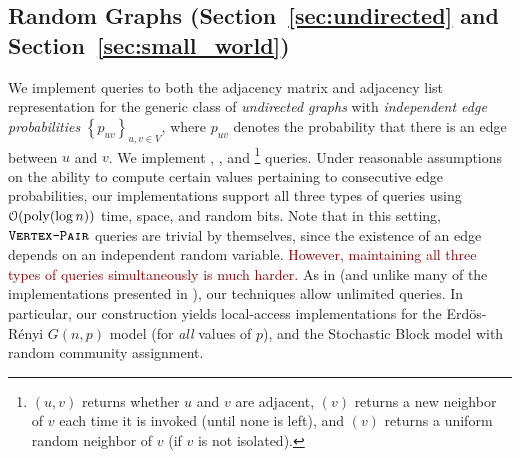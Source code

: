 \subsection{Random Graphs (Section~\ref{sec:undirected} and Section~\ref{sec:small_world})}%
\label{sec:random_graphs}
We implement queries to both the adjacency matrix and adjacency list representation
for the generic class of \emph{undirected graphs} with {\em independent edge probabilities} $\left\{ p_{uv} \right\}_{u,v\in V}$,
where $p_{uv}$ denotes the probability that there is an edge between $u$ and $v$.
We implement , , and 
\footnote{$(u,v)$ returns whether $u$ and $v$ are adjacent, $(v)$ returns a new neighbor of $v$ each time
it is invoked (until none is left), and $(v)$ returns a uniform random neighbor of $v$ (if $v$ is not isolated).} queries.
Under reasonable assumptions on the ability to compute certain values pertaining to consecutive edge probabilities,
our implementations support all three types of queries using $\mathcal{O}(\mathrm{poly}(\log n))$ time, space, and random bits.
Note that in this setting, $\texttt{\textsc{Vertex-Pair}}$ queries are trivial by themselves,
since the existence of an edge depends on an independent random variable.
\textcolor{Maroon}{However, maintaining all three types of queries simultaneously is much harder.}
As in \cite{reut} (and unlike many of the implementations presented in \cite{huge_old,huge}), our techniques allow unlimited queries.
In particular, our construction yields local-access implementations for the Erd\"{o}s-R\'{e}nyi $G(n,p)$ model (for \emph{all} values of $p$),
and the Stochastic Block model with random community assignment.


